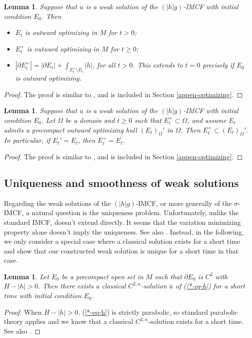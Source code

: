 \documentclass[11pt, letterpaper]{amsart}
\newtheorem{lem}[thm]{Lemma}
\theoremstyle{definition}
\theoremstyle{remark}
\begin{document}
\begin{lem}\label{lem-optimizing-property}
	Suppose that $u$ is a weak solution of the $(|h|g)$-IMCF with initial condition $E_0$. Then
	\begin{itemize}
		\item [(i)] $E_t$ is outward optimizing in $M$ for $t>0$;
		\item [(ii)] $E_t ^{+}$ is outward optimizing in $M$ for $t \geq 0$;
		\item [(iii)] $|\partial E_t ^{+}| = |\partial E_t| + \int_{E_t ^{+}\setminus E_t}|h|$, for all $t>0$. This extends to $t=0$ precisely if $E_0$ is outward optimizing.
	\end{itemize}
\end{lem}
\begin{proof}
	The proof is similar to \cite[Theorem 1.4]{HI01}, and is included in Section \ref{appen-optimizing}.
\end{proof}

\begin{lem}\label{E_t+-vs-E_t'}
	Suppose that $u$ is a weak solution of the $(|h|g)$-IMCF with initial condition $E_0$. Let $\Omega $ be a domain and $t \geq 0$ such that $E_t^+ \subset \Omega $, and assume $E_t$ admits a precompact outward optimizing hull $(E_{t})_{\Omega }'$ in $\Omega $. Then 
 $E_t ^+ \subset (E_t)_{\Omega }'$. In particular, if $E_t'= E_t$, then $E_t ^+ = E_t$.
\end{lem}
\begin{proof}
	The proof is similar to \cite[Proposition 8.3]{HuiskenWolff22}, and is included in Section \ref{appen-optimizing}. 
\end{proof}

\subsection{Uniqueness and smoothness of weak solutions}
Regarding the weak solutions of the $(|h|g)$-IMCF, or more generally of the $\sigma $-IMCF, a natural question is the uniqueness problem.  Unfortunately, unlike the standard IMCF, \cite[Uniqueness Theorem 2.2]{HI01} doesn't extend directly. It seems that the variation minimizing property alone doesn't imply the uniqueness. See also \cite[Remark 6.7]{HuiskenWolff22}. Instead, in the following, we only consider a special case
where a classical solution exists for a short time and show that our constructed weak solution is unique for a short time in that case.

\begin{lem}\label{lem-short-time}
	Let $E_0$ be a precompact open set in $M$ such that $\partial E_0$ is $C^2$ with $H- |h|>0$. Then there exists a classical $C^{2,\alpha }$-solution $\bar{u}$ of (\ref{*-eq-h}) for a short time with initial condition $E_0$.
\end{lem}
\begin{proof}
	When $H- |h|>0$, (\ref{*-eq-h}) is strictly parabolic, so standard parabolic theory applies and we know that a classical $C^{2,\alpha }$-solution exists for a short time. See also \cite[Theorem 7.17]{HP96}.
\end{proof}
\end{document}
